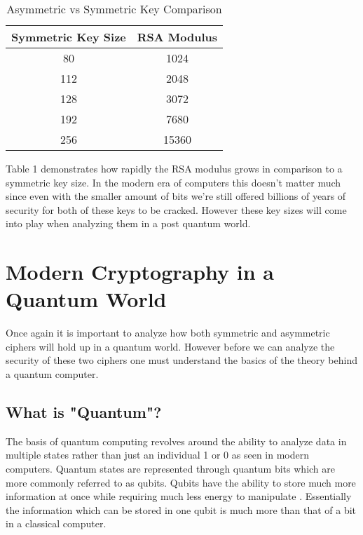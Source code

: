 \documentclass[fleqn, 12pt]{article}
\begin{document}
\begin{table}[!h]
    \caption{Asymmetric vs Symmetric Key Comparison \cite[p.~306]{textbook}}
    \label{table:keys}
    \begin{center}
        \begin{tabular}{|c|c|}
            \hline
                \textbf{Symmetric Key Size} & \textbf{RSA Modulus}\\\hline
                80 & 1024\\
                112 & 2048\\
                128 & 3072\\
                192 & 7680\\
                256 & 15360\\
            \hline
        \end{tabular}
    \end{center}
\end{table}

Table 1 demonstrates how rapidly the RSA modulus grows in comparison to a symmetric key size. In the modern era of computers this doesn't matter much since even with the smaller amount of bits we're still offered billions of years of security for both of these keys to be cracked. However these key sizes will come into play when analyzing them in a post quantum world.

\section{Modern Cryptography in a Quantum World}

Once again it is important to analyze how both symmetric and asymmetric ciphers will hold up in a quantum world. However before we can analyze the security of these two ciphers one must understand the basics of the theory behind a quantum computer.

\subsection{What is "Quantum"?}

The basis of quantum computing revolves around the ability to analyze data in multiple states rather than just an individual 1 or 0 as seen in modern computers. Quantum states are represented through quantum bits which are more commonly referred to as qubits. Qubits have the ability to store much more information at once while requiring much less energy to manipulate \cite{qubits}. Essentially the information which can be stored in one qubit is much more than that of a bit in a classical computer.
\end{document}
